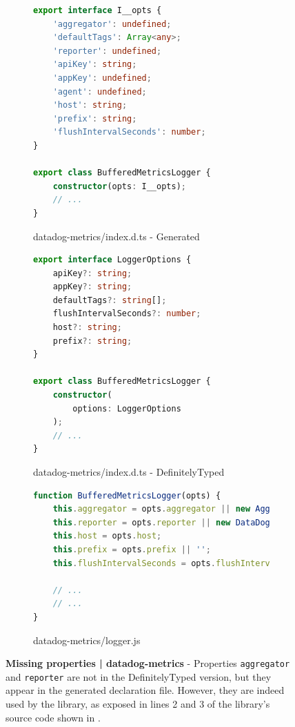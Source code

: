 \documentclass[a4paper,english,cleveref, autoref]{lipics-v2019}
\begin{document}
\begin{figure}[tp]
    \centering
    \begin{subfigure}{0.48\linewidth}
      \begin{lstlisting}[language=TypeScript]
export interface I__opts {
    'aggregator': undefined;
    'defaultTags': Array<any>;
    'reporter': undefined;
    'apiKey': string;
    'appKey': undefined;
    'agent': undefined;
    'host': string;
    'prefix': string;
    'flushIntervalSeconds': number;
}

export class BufferedMetricsLogger {
    constructor(opts: I__opts);
    // ...
}
      \end{lstlisting}
      \caption{datadog-metrics/index.d.ts - Generated}
    \end{subfigure}
    \hfill
    \begin{subfigure}{0.48\linewidth}
      \begin{lstlisting}[language=TypeScript]
export interface LoggerOptions {
    apiKey?: string;
    appKey?: string;
    defaultTags?: string[];
    flushIntervalSeconds?: number;
    host?: string;
    prefix?: string;
}

export class BufferedMetricsLogger {
    constructor(
        options: LoggerOptions
    );
    // ...
}
      \end{lstlisting}
      \caption{datadog-metrics/index.d.ts - DefinitelyTyped}
    \end{subfigure}

    \begin{subfigure}{0.80\linewidth}
        \begin{lstlisting}[language=TypeScript]
function BufferedMetricsLogger(opts) {
    this.aggregator = opts.aggregator || new Aggregator(opts.defaultTags);
    this.reporter = opts.reporter || new DataDogReporter(opts.apiKey, opts.appKey, opts.agent);
    this.host = opts.host;
    this.prefix = opts.prefix || '';
    this.flushIntervalSeconds = opts.flushIntervalSeconds;

    // ...
    // ...
}
        \end{lstlisting}
        \caption{datadog-metrics/logger.js}
        \label{fig:subfloat-datadog-logger}
      \end{subfigure}

    \caption{\textbf{Missing properties | datadog-metrics} - Properties \lstinline{aggregator} and \lstinline{reporter} are not in the DefinitelyTyped version, but they appear in the generated declaration file. However, they are indeed used by the library, as exposed in lines 2 and 3 of the library's source code shown in \protect{}.}
    \label{fig:experiments-results-module-datadog-metrics}
\end{figure}
\end{document}
